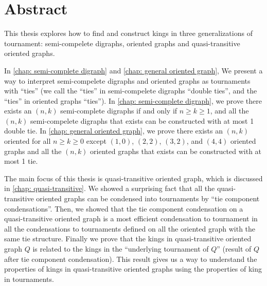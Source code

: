 \chapter{Abstract}

This thesis explores how to find and construct kings
in three generalizations of tournament:
semi-compelete digraphs, oriented graphs and
quasi-transitive oriented graphs.

In \cref{chap: semi-complete digraph} and \cref{chap: general oriented graph},
We present a way to interpret semi-compelete digraphs
and oriented graphs as tournaments with ``ties''
(we call the ``ties'' in semi-compelete digraphs ``double ties'',
and the ``ties'' in oriented graphs ``ties'').
In \cref{chap: semi-complete digraph},
we prove there exists an \((n, k)\) semi-complete digraphs
if and only if \(n \geq k \geq 1\),
and all the \((n, k)\) semi-compelete digraphs that exists
can be constructed with at most 1 double tie.
In \cref{chap: general oriented graph},
we prove there exists an \((n, k)\) oriented
for all \(n \geq k \geq 0\) except
\((1,0)\), \((2,2)\), \((3,2)\), and \((4,4)\) oriented graphs
and all the \((n, k)\) oriented graphs that exists
can be constructed with at most 1 tie.

The main focus of this thesis is quasi-transitive oriented graph,
which is discussed in \cref{chap: quasi-transitive}.
We showed a surprising fact that
all the quasi-transitive oriented graphs
can be condensed into tournaments by
``tie component condensations''.
Then, we showed that the tie component condensation
on a quasi-transitive oriented graph
is a most efficient condensation to tournament
in all the condensations to tournaments
defined on all the oriented graph with the same tie structure.
Finally we prove that the kings in
quasi-transitive oriented graph \(Q\) is related to
the kings in the ``underlying tournament of \(Q\)''
(result of \(Q\) after tie component condensation).
This result gives us a way to understand the
properties of kings in quasi-transitive oriented graphs
using the properties of king in tournaments.
